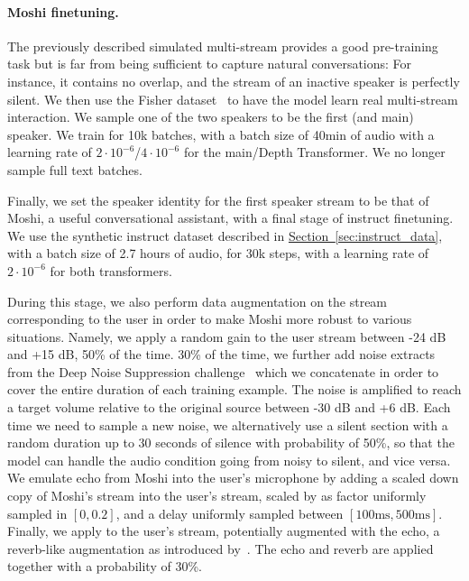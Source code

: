 \paragraph{Moshi finetuning.}
\label{sec:moshift}

The previously described simulated multi-stream provides a good pre-training task but is far from being sufficient to capture natural conversations: For instance, it contains no overlap, and the stream of an inactive speaker is perfectly silent. We then use the Fisher dataset~\citep{cieri2004fisher} to have the model learn real multi-stream interaction. We sample one of the two speakers to be the first (and main) speaker. We train for 10k batches, with a batch size of 40min of audio with a learning rate of $2\cdot 10^{-6}$/$4\cdot 10^{-6}$ for the main/Depth Transformer. We no longer sample full text batches.

Finally, we set the speaker identity for the first speaker stream to be that of Moshi, a useful conversational assistant, with a final stage of instruct finetuning. We use the synthetic instruct dataset described in \hyperref[sec:instruct_data]{Section~\ref{sec:instruct_data}}, with a batch size of 2.7 hours of audio, for 30k steps, with a learning rate of $2\cdot 10^{-6}$ for both transformers. 

During this stage, we also perform data augmentation on the stream corresponding to the user in order to make Moshi more robust to various situations. Namely, we apply a random gain to the user stream between -24 dB and +15 dB, 50\% of the time. 30\% of the time, we further add noise extracts from the Deep Noise Suppression challenge~\citep{dubey2023icassp} which we concatenate in order to cover the entire duration of each training example. The noise is amplified to reach a target volume relative to the original source between -30 dB and +6 dB. Each time we need to sample a new noise, we alternatively use a silent section with a random duration up to 30 seconds of silence with probability of 50\%, so that the model can handle the audio condition going from noisy to silent, and vice versa. We emulate echo from Moshi into the user's microphone by adding a scaled down copy of Moshi's stream into the user's stream, scaled by as factor uniformly sampled in $[0, 0.2]$, and a delay uniformly sampled between $[100\text{ms}, 500\text{ms}]$. Finally, we apply to the user's stream, potentially augmented with the echo, a reverb-like augmentation as introduced by~\citet{defossez2020real}. The echo and reverb are applied together with a probability of 30\%.

